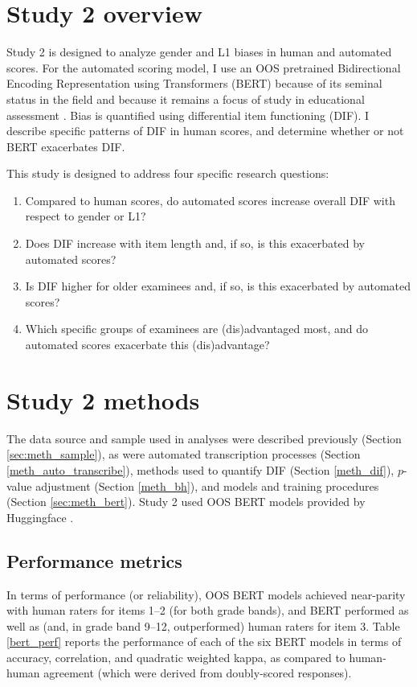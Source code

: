 \documentclass [PhD] {uclathes}
\begin{document}
\section{Study 2 overview} 

Study 2 is designed to analyze gender and L1 biases in human and automated scores. For the automated scoring model, I use an OOS pretrained Bidirectional Encoding Representation using Transformers (BERT) because of its seminal status in the field \citep{devlin2018} and because it remains a focus of study in educational assessment \citep{wang2021automated}. Bias is quantified using differential item functioning (DIF). I describe specific patterns of DIF in human scores, and determine whether or not BERT exacerbates DIF. 

This study is designed to address four specific research questions:

\begin{enumerate}
	\item Compared to human scores, do automated scores increase overall DIF with respect to gender or L1? 
	\item Does DIF increase with item length and, if so, is this exacerbated by automated scores?
	\item Is DIF higher for older examinees and, if so, is this exacerbated by automated scores?
	\item Which specific groups of examinees are (dis)advantaged most, and do automated scores exacerbate this (dis)advantage?
\end{enumerate}

\section{Study 2 methods}

The data source and sample used in analyses were described previously (Section \ref{sec:meth_sample}), as were automated transcription processes (Section \ref{meth_auto_transcribe}), methods used to quantify DIF (Section \ref{meth_dif}), $p$-value adjustment (Section \ref{meth_bh}), and models and training procedures (Section \ref{sec:meth_bert}). Study 2 used OOS BERT models provided by Huggingface \citep{wolf_transformers_2020}. 

\subsection{Performance metrics}

In terms of performance (or reliability), OOS BERT models achieved near-parity with human raters for items 1–2 (for both grade bands), and BERT performed as well as (and, in grade band 9–12, outperformed) human raters for item 3. Table \ref{bert_perf} reports the performance of each of the six BERT models in terms of accuracy, correlation, and quadratic weighted kappa, as compared to human-human agreement (which were derived from doubly-scored responses). 
\end{document}
